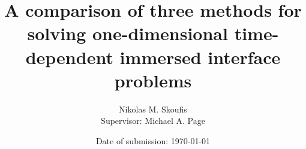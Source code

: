 \begin{titlepage}
    \title{A comparison of three methods for solving one-dimensional time-dependent immersed interface problems}
    \author{Nikolas M. Skoufis\\
    Supervisor: Michael A. Page}
    \date{Date of submission: \today}
    \maketitle
\end{titlepage}
